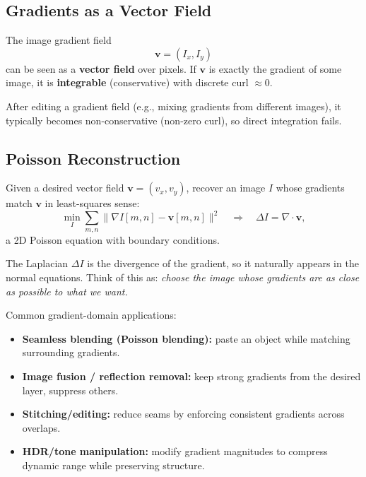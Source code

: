 \documentclass[11pt, oneside]{book}
\newcommand{\vct}[1]{\bm{#1}}           %
\begin{document}
\subsection{Gradients as a Vector Field}

\begin{defbox}[title={Gradient Field}]
The image gradient field
\[
\vct{v} = (I_x, I_y)
\]
can be seen as a \textbf{vector field} over pixels.
If $\vct{v}$ is exactly the gradient of some image, it is \textbf{integrable} (conservative) with discrete curl $\approx 0$.
\end{defbox}

After editing a gradient field (e.g., mixing gradients from different images), it typically becomes non-conservative
(non-zero curl), so direct integration fails.

\subsection{Poisson Reconstruction}

\begin{thmbox}[title={Poisson Reconstruction}]
Given a desired vector field $\vct{v}=(v_x,v_y)$, recover an image $I$ whose gradients match $\vct{v}$
in least-squares sense:
\[
\min_I \sum_{m,n} \|\nabla I[m,n] - \vct{v}[m,n]\|^2
\quad\Longrightarrow\quad
\Delta I = \nabla\cdot \vct{v},
\]
a 2D Poisson equation with boundary conditions.
\end{thmbox}

The Laplacian $\Delta I$ is the divergence of the gradient, so it naturally appears in the normal equations.
Think of this as: \emph{choose the image whose gradients are as close as possible to what we want.}

Common gradient-domain applications:
\begin{itemize}
  \item \textbf{Seamless blending (Poisson blending):} paste an object while matching surrounding gradients.
  \item \textbf{Image fusion / reflection removal:} keep strong gradients from the desired layer, suppress others.
  \item \textbf{Stitching/editing:} reduce seams by enforcing consistent gradients across overlaps.
  \item \textbf{HDR/tone manipulation:} modify gradient magnitudes to compress dynamic range while preserving structure.
\end{itemize}
\end{document}
